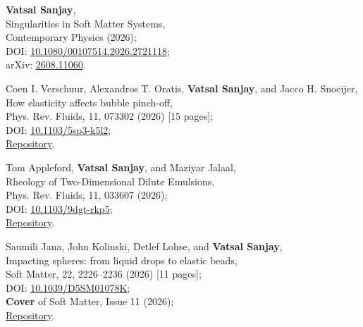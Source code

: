 \begin{enumerate}[leftmargin=1.5em,label=\textbf{[\arabic*]}]
	\item \textbf{Vatsal Sanjay},\\
	Singularities in Soft Matter Systems,\\
	Contemporary Physics (2026);\\
	\faFile\hspace{0.2em}DOI: \href{https://doi.org/10.1080/00107514.2026.2721118}{10.1080/00107514.2026.2721118};\\
	\faFile\hspace{0.2em}arXiv: \href{https://arxiv.org/abs/2608.11060}{2608.11060}.

	\item Coen I. Verschuur, Alexandros T. Oratis, \textbf{Vatsal Sanjay}, and Jacco H. Snoeijer,\\
	How elasticity affects bubble pinch-off,\\
	Phys. Rev. Fluids, 11, 073302 (2026) [15 pages];\\
	\faFile\hspace{0.2em}DOI: \href{https://doi.org/10.1103/5sp3-k5l2}{10.1103/5sp3-k5l2};\\
	\faGithub\hspace{0.2em}\href{https://github.com/comphy-lab/ElasticPinchOff}{Repository}.

	\item Tom Appleford, \textbf{Vatsal Sanjay}, and Maziyar Jalaal,\\
	Rheology of Two-Dimensional Dilute Emulsions,\\
	Phys. Rev. Fluids, 11, 033607 (2026);\\
	\faFile\hspace{0.2em}DOI: \href{https://doi.org/10.1103/9dgt-rkp5}{10.1103/9dgt-rkp5};\\
	\faGithub\hspace{0.2em}\href{https://github.com/tappleford/droplet_under_shear_newtonian_2D}{Repository}.

	\item Saumili Jana, John Kolinski, Detlef Lohse, and \textbf{Vatsal Sanjay},\\
	Impacting spheres: from liquid drops to elastic beads,\\
	Soft Matter, 22, 2226--2236 (2026) [11 pages];\\
	\faFile\hspace{0.2em}DOI: \href{https://doi.org/10.1039/D5SM01078K}{10.1039/D5SM01078K};\\
	\faStar\hspace{0.2em}\textbf{Cover} of Soft Matter, Issue 11 (2026);\\
	\faGithub\hspace{0.2em}\href{https://github.com/comphy-lab/Soft-Sphere-Impacts}{Repository}.


\end{enumerate}
